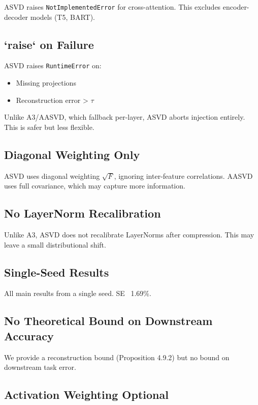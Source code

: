ASVD raises \texttt{NotImplementedError} for cross-attention. This excludes 
encoder-decoder models (T5, BART).

\subsection{`raise` on Failure}

ASVD raises \texttt{RuntimeError} on:
\begin{itemize}
\item Missing projections
\item Reconstruction error \textgreater{} $\tau$

\end{itemize}
Unlike A3/AASVD, which fallback per-layer, ASVD aborts injection entirely. 
This is safer but less flexible.

\subsection{Diagonal Weighting Only}

ASVD uses diagonal weighting $\sqrt{F}$, ignoring inter-feature 
correlations. AASVD uses full covariance, which may capture more 
information.

\subsection{No LayerNorm Recalibration}

Unlike A3, ASVD does not recalibrate LayerNorms after compression. This 
may leave a small distributional shift.

\subsection{Single-Seed Results}

All main results from a single seed. SE ~1.69\%.

\subsection{No Theoretical Bound on Downstream Accuracy}

We provide a reconstruction bound (Proposition 4.9.2) but no bound on 
downstream task error.

\subsection{Activation Weighting Optional}

